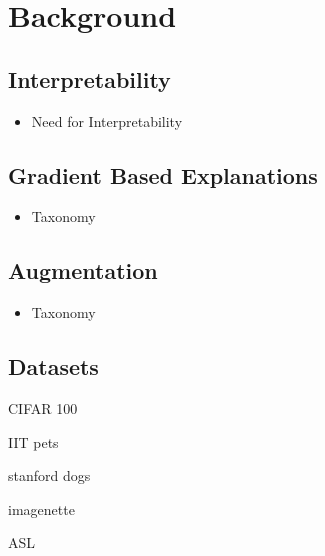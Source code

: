 \chapter{Background}
\section{Interpretability}
\begin{itemize}
\item Need for Interpretability
\end{itemize}
\section{Gradient Based Explanations}
\begin{itemize}
\item Taxonomy
\end{itemize}
\section{Augmentation}
\begin{itemize}
\item Taxonomy
\end{itemize}
\section{Datasets}
CIFAR 100

IIT pets

stanford dogs

imagenette

ASL